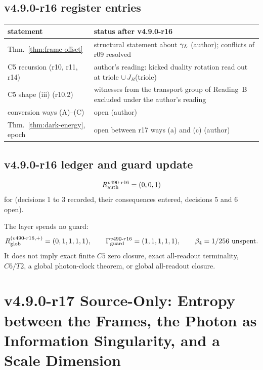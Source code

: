 \subsection*{v4.9.0-r16 register entries}
\label{subsec:v490-r16-register}

\begin{center}
\small
\begin{tabular}{@{}>{\raggedright\arraybackslash}p{}>{\raggedright\arraybackslash}p{}@{}}
\toprule
statement & status after v4.9.0-r16\\
\midrule
Thm.~\ref{thm:frame-offset} & structural statement about \(\gamma_L\) (author); conflicts of r09 resolved\\
C5 recursion (r10, r11, r14) & author's reading: kicked duality rotation read out at triole \(\cup\,J_B\)(triole)\\
C5 shape (iii) (r10.2) & witnesses from the transport group of Reading~B excluded under the author's reading\\
conversion ways (A)--(C) & open (author)\\
Thm.~\ref{thm:dark-energy}, epoch & open between r17 ways (a) and (c) (author)\\
\bottomrule
\end{tabular}
\end{center}

\subsection*{v4.9.0-r16 ledger and guard update}
\label{subsec:v490-r16-ledger-guard}

\[
R_{\rm auth}^{v490\text{-}r16}=(0,0,1)
\]
for (decisions 1 to 3 recorded, their consequences entered, decisions 5 and 6 open).

The layer spends no guard:
\[
R_{\rm glob}^{(v490\text{-}r16,+)}=(0,1,1,1,1),
\qquad
\Gamma_{\rm guard}^{v490\text{-}r16}=(1,1,1,1,1),
\qquad
\beta_4=1/256\ \text{unspent}.
\]
It does not imply exact finite \(C5\) zero closure, exact all-readout terminality,
\(C6/T2\), a global photon-clock theorem, or global all-readout closure.

\clearpage
\section*{v4.9.0-r17 Source-Only: Entropy between the Frames, the Photon as Information Singularity, and a Scale Dimension}
\label{sec:v490-r17-entropy-scale}

